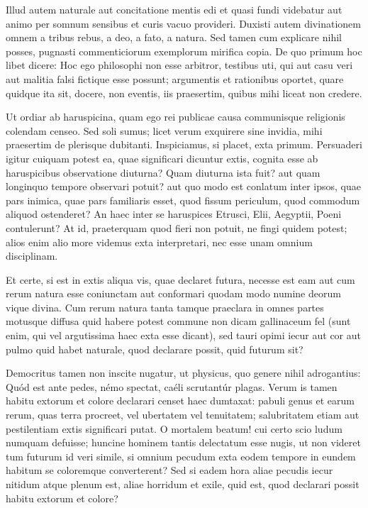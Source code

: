  Illud autem naturale aut concitatione mentis edi et quasi fundi videbatur aut animo per somnum sensibus et curis vacuo provideri. Duxisti autem divinationem omnem a tribus rebus, a deo, a fato, a natura. Sed tamen cum explicare nihil posses, pugnasti commenticiorum exemplorum mirifica copia. De quo primum hoc libet dicere: Hoc ego philosophi non esse arbitror, testibus uti, qui aut casu veri aut malitia falsi fictique esse possunt; argumentis et rationibus oportet, quare quidque ita sit, docere, non eventis, iis praesertim, quibus mihi liceat non credere.

 Ut ordiar ab haruspicina, quam ego rei publicae causa communisque religionis colendam censeo. Sed soli sumus; licet verum exquirere sine invidia, mihi praesertim de plerisque dubitanti. Inspiciamus, si placet, exta primum. Persuaderi igitur cuiquam potest ea, quae significari dicuntur extis, cognita esse ab haruspicibus observatione diuturna? Quam diuturna ista fuit? aut quam longinquo tempore observari potuit? aut quo modo est conlatum inter ipsos, quae pars inimica, quae pars familiaris esset, quod fissum periculum, quod commodum aliquod ostenderet? An haec inter se haruspices Etrusci, Elii, Aegyptii, Poeni contulerunt? At id, praeterquam quod fieri non potuit, ne fingi quidem potest; alios enim alio more videmus exta interpretari, nec esse unam omnium disciplinam.

 Et certe, si est in extis aliqua vis, quae declaret futura, necesse est eam aut cum rerum natura esse coniunctam aut conformari quodam modo numine deorum vique divina. Cum rerum natura tanta tamque praeclara in omnes partes motusque diffusa quid habere potest commune non dicam gallinaceum fel (sunt enim, qui vel argutissima haec exta esse dicant), sed tauri opimi iecur aut cor aut pulmo quid habet naturale, quod declarare possit, quid futurum sit?

 Democritus tamen non inscite nugatur, ut physicus, quo genere nihil adrogantius: Quód est ante pedes, némo spectat, caéli scrutantúr plagas. Verum is tamen habitu extorum et colore declarari censet haec dumtaxat: pabuli genus et earum rerum, quas terra procreet, vel ubertatem vel tenuitatem; salubritatem etiam aut pestilentiam extis significari putat. O mortalem beatum! cui certo scio ludum numquam defuisse; huncine hominem tantis delectatum esse nugis, ut non videret tum futurum id veri simile, si omnium pecudum exta eodem tempore in eundem habitum se coloremque converterent? Sed si eadem hora aliae pecudis iecur nitidum atque plenum est, aliae horridum et exile, quid est, quod declarari possit habitu extorum et colore?

